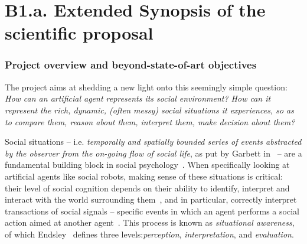 
\newrefsection


\chapter{B1.a. Extended Synopsis of the scientific proposal}\label{part1}




\subsection{Project overview and beyond-state-of-art objectives}

The \project project aims at shedding a new light onto this seemingly simple
question: \emph{How can an artificial agent represents its social environment?
How can it represent the rich, dynamic, (often messy) social situations it
experiences, so as to compare them, reason about them, interpret them, make
decision about them?}

Social situations -- i.e. \emph{temporally and spatially bounded series of
events abstracted by the observer from the on-going flow of social life}, as put
by Garbett in~\cite{garbett1970analysis} -- are a fundamental building block in
social psychology~\cite{argyle1981social}. When specifically looking at
artificial agents like social robots, making sense of these situations is critical:
their level of social cognition depends on their ability to identify, interpret
and interact with the world surrounding
them~\cite{szczepanowski2017computational}, and in particular, correctly
interpret transactions of social signals -- specific events in which an agent
performs a social action aimed at another agent~\cite{pantic2011social}. This
process is known as \textit{situational awareness}, of which
Endsley~\cite{endsley1995theory} defines three levels:\emph{perception},
\emph{interpretation}, and \emph{evaluation}.

